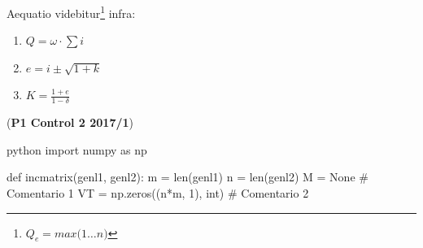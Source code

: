 %
%


	\lipsum[10-11]


	Aequatio videbitur\footnote{ $Q_e = max\big(1 \dots n\big)$} infra:


 \lipsum[4]

	\begin{enumerate}
		\item {$Q = \omega \cdot \sum i$}
		\item {$e = i \pm \sqrt{1+k}$}
		\item {$K = \frac{1 + e}{1 - \delta}$}
	\end{enumerate}

 (\textbf{P1 Control 2 2017/1}) \lipsum[117] \\

\begin{sourcecode}{python}{}
import numpy as np

def incmatrix(genl1, genl2):
	m = len(genl1)
	n = len(genl2)
	M = None # Comentario 1
	VT = np.zeros((n*m, 1), int) # Comentario 2
\end{sourcecode}